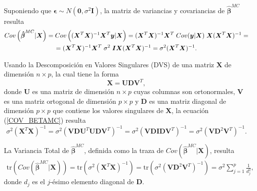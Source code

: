 \documentclass[a4paper,12pt]{report}
\begin{document}
Suponiendo que $\boldsymbol{\epsilon} \sim N(\boldsymbol{0}, \sigma^2 \boldsymbol{I})$, la matriz de variancias y covariancias de $\boldsymbol{\hat{\beta}}^{MC}$ resulta
\begin{gather}
\nonumber
Cov\left(\boldsymbol{\hat{\beta}}^{MC}|\boldsymbol{X}\right)=Cov\left((\boldsymbol{X}^T\boldsymbol{X})^{-1}\boldsymbol{X}^T\boldsymbol{y}|\boldsymbol{X}\right)=(\boldsymbol{X}^T\boldsymbol{X})^{-1}\boldsymbol{X}^T \hspace{0.1cm} Cov(\boldsymbol{y}|\boldsymbol{X}) \hspace{0.1cm} \boldsymbol{X}(\boldsymbol{X}^T\boldsymbol{X})^{-1}=\\
\label{COV_BETAMC}
=(\boldsymbol{X}^T\boldsymbol{X})^{-1}\boldsymbol{X}^T \hspace{0.1cm} \sigma^2 \hspace{0.1cm} \boldsymbol{I}\boldsymbol{X}(\boldsymbol{X}^T\boldsymbol{X})^{-1}=\sigma^2 (\boldsymbol{X}^T\boldsymbol{X})^{-1}.
\end{gather}

Usando la Descomposición en Valores Singulares (DVS) de una matriz $\boldsymbol{X}$ de dimensión $n \times p$, la cual tiene la forma
\begin{equation}
\label{DVS_X}
\boldsymbol{X}=\boldsymbol{U}\boldsymbol{D}\boldsymbol{V}^T,
\end{equation}
donde $\boldsymbol{U}$ es una matriz de dimensión $n \times p$ cuyas columnas son ortonormales, $\boldsymbol{V}$ es una matriz ortogonal de dimensión $p \times p$ y $\boldsymbol{D}$ es una matriz diagonal de dimensión $p \times p$ que contiene los valores singulares de $\boldsymbol{X}$, la ecuación (\ref{COV_BETAMC}) resulta
\begin{equation}
\sigma^2 (\boldsymbol{X}^T\boldsymbol{X})^{-1}=\sigma^2 (\boldsymbol{V}\boldsymbol{D}\boldsymbol{U}^T\boldsymbol{U}\boldsymbol{D}\boldsymbol{V}^T)^{-1}=\sigma^2(\boldsymbol{V}\boldsymbol{D}\boldsymbol{I}\boldsymbol{D}\boldsymbol{V}^T)^{-1}=\sigma^2(\boldsymbol{V}\boldsymbol{D}^2\boldsymbol{V}^T)^{-1}.
\end{equation}

La Variancia Total de $\boldsymbol{\hat{\beta}}^{MC}$, definida como la traza de $Cov\left(\boldsymbol{\hat{\beta}}^{MC}|\boldsymbol{X}\right)$, resulta
\begin{gather}
\text{tr}\left(Cov\left(\boldsymbol{\hat{\beta}}^{MC}|\boldsymbol{X}\right)\right)=\text{tr}\left(\sigma^2 (\boldsymbol{X}^T\boldsymbol{X})^{-1}\right)=\text{tr}\left(\sigma^2(\boldsymbol{V}\boldsymbol{D}^2\boldsymbol{V}^T)^{-1}\right)=\sigma^2 \sum_{j=1}^p \frac{1}{d_j^2},
\end{gather}
donde $d_j$ es el $j$-ésimo elemento diagonal de $\boldsymbol{D}$.
\end{document}
